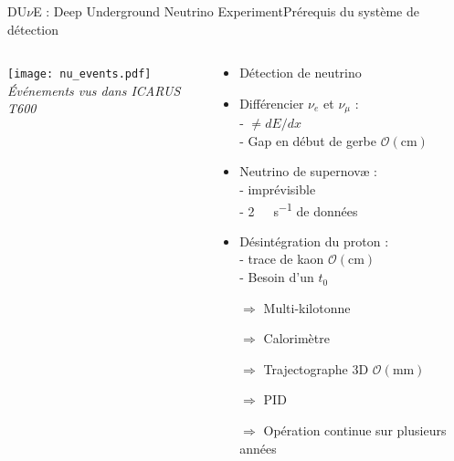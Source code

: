     \begin{frame}{DU$\nu$E : Deep Underground Neutrino Experiment}{Prérequis du système de détection}
        \begin{scriptsize}
            \begin{columns}
                \begin{column}{0.5\textwidth}
                    \texttt{[image: nu\_events.pdf]}\\\textit{Événements vus dans ICARUS T600}
                \end{column}
                 \begin{column}{0.5\textwidth}
                    \begin{itemize}
                        \item Détection de neutrino
                        \item Différencier $\nu_e$ et $\nu_{\mu}$ : \\ - $\neq dE/dx$ \\ - Gap en début de gerbe $\mathcal{O}(\si{\centi\meter})$
                        \item Neutrino de supernovæ : \\ - imprévisible \\ - \SI{2}{\tera\byte\per\second} de données
                        \item Désintégration du proton : \\ - trace de kaon $\mathcal{O}(\si{\centi\meter})$ \\ - Besoin d'un $t_0$
                    \end{itemize}
                    \begin{itemize}
                        \item[$\Rightarrow$] Multi-kilotonne
                        \item[$\Rightarrow$] Calorimètre
                        \item[$\Rightarrow$] Trajectographe 3D $\mathcal{O}(\si{\milli\meter})$
                        \item[$\Rightarrow$] PID
                        \item[$\Rightarrow$] Opération continue sur plusieurs années
                    \end{itemize}
                \end{column}
            \end{columns}
        \end{scriptsize}
    \end{frame}

